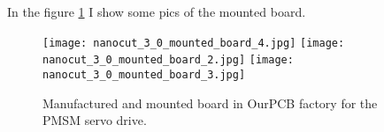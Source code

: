 In the figure \ref{fig:nanocut_3_0_3} I show some pics of the mounted board.
  \begin{figure}
      \begin{center}
         \texttt{[image: nanocut\_3\_0\_mounted\_board\_4.jpg]}
         \texttt{[image: nanocut\_3\_0\_mounted\_board\_2.jpg]}
         \texttt{[image: nanocut\_3\_0\_mounted\_board\_3.jpg]}
      \end{center}
      \caption{Manufactured and mounted board in OurPCB factory for the PMSM servo drive.}
      \label{fig:nanocut_3_0_3}
   \end{figure}
